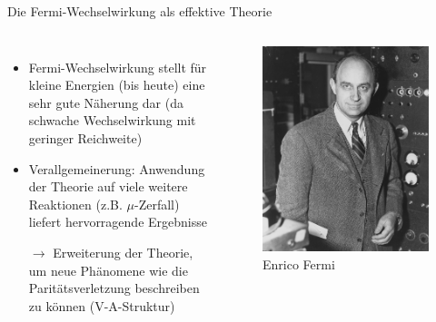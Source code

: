 \documentclass[aspectratio=1610, professionalfonts, 10pt]{beamer}
\begin{document}
\begin{frame}{Die Fermi-Wechselwirkung als effektive Theorie}
	\begin{columns}
			\begin{itemize}
				\setlength\itemsep{0.5em}
				\item Fermi-Wechselwirkung stellt für kleine Energien (bis heute) eine sehr gute Näherung dar (da schwache Wechselwirkung mit geringer Reichweite)
				\item Verallgemeinerung: Anwendung der Theorie auf viele weitere Reaktionen (z.B. $\mu$-Zerfall) liefert hervorragende Ergebnisse
				\item [$\rightarrow$] Erweiterung der Theorie, um neue Phänomene wie die Paritätsverletzung beschreiben zu können (V-A-Struktur)
			\end{itemize}
			\begin{figure}
	  			\centering
				\includegraphics[width=\linewidth]{Images/Enrico_Fermi_1943-49.jpg}
	  			\caption{Enrico Fermi \cite{wiki:fermi}}
	  			\label{fig:fermi}
			\end{figure}
	\end{columns}
\end{frame}
\end{document}
